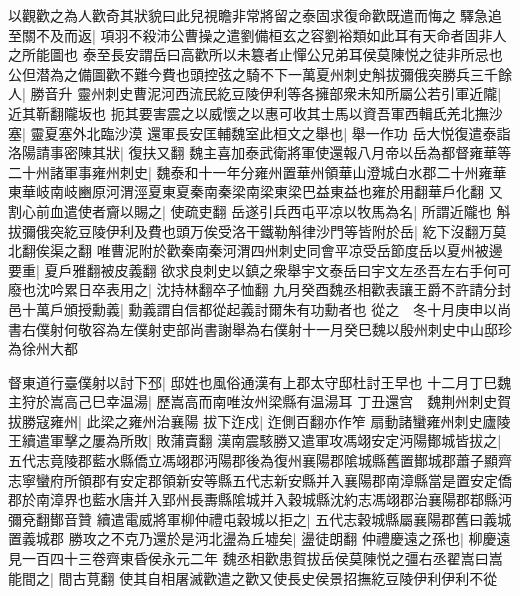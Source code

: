 以觀歡之為人歡奇其狀貌曰此兒視瞻非常將留之泰固求復命歡既遣而悔之驛急追至關不及而返|{
	項羽不殺沛公曹操之遣劉備桓玄之容劉裕類如此耳有天命者固非人之所能圖也}
泰至長安謂岳曰高歡所以未簒者止憚公兄弟耳侯莫陳悦之徒非所忌也公但潜為之備圖歡不難今費也頭控弦之騎不下一萬夏州刺史斛拔彌俄突勝兵三千餘人|{
	勝音升}
靈州刺史曹泥河西流民紇豆陵伊利等各擁部衆未知所屬公若引軍近隴|{
	近其靳翻隴坂也}
扼其要害震之以威懷之以惠可收其士馬以資吾軍西輯氐羌北撫沙塞|{
	靈夏塞外北臨沙漠}
還軍長安匡輔魏室此桓文之舉也|{
	舉一作功}
岳大悦復遣泰詣洛陽請事密陳其狀|{
	復扶又翻}
魏主喜加泰武衛將軍使還報八月帝以岳為都督雍華等二十州諸軍事雍州刺史|{
	魏泰和十一年分雍州置華州領華山澄城白水郡二十州雍華東華岐南岐豳原河渭涇夏東夏秦南秦梁南梁東梁巴益東益也雍於用翻華戶化翻}
又割心前血遣使者齎以賜之|{
	使疏吏翻}
岳遂引兵西屯平凉以牧馬為名|{
	所謂近隴也}
斛拔彌俄突紇豆陵伊利及費也頭万俟受洛干鐵勒斛律沙門等皆附於岳|{
	紇下沒翻万莫北翻俟渠之翻}
唯曹泥附於歡秦南秦河渭四州刺史同會平凉受岳節度岳以夏州被邊要重|{
	夏戶雅翻被皮義翻}
欲求良刺史以鎮之衆舉宇文泰岳曰宇文左丞吾左右手何可廢也沈吟累日卒表用之|{
	沈持林翻卒子恤翻}
九月癸酉魏丞相歡表讓王爵不許請分封邑十萬戶頒授勳義|{
	勳義謂自信都從起義討爾朱有功勳者也}
從之　冬十月庚申以尚書右僕射何敬容為左僕射吏部尚書謝舉為右僕射十一月癸巳魏以殷州刺史中山邸珍為徐州大都

督東道行臺僕射以討下邳|{
	邸姓也風俗通漢有上郡太守邸杜討王早也}
十二月丁巳魏主狩於嵩高己巳幸温湯|{
	歷嵩高而南唯汝州梁縣有温湯耳}
丁丑還宫　魏荆州刺史賀拔勝寇雍州|{
	此梁之雍州治襄陽}
拔下迮戍|{
	迮側百翻亦作笮}
扇動諸蠻雍州刺史廬陵王續遣軍擊之屢為所敗|{
	敗蒲賣翻}
漢南震駭勝又遣軍攻馮翊安定沔陽鄼城皆拔之|{
	五代志竟陵郡藍水縣僑立馮翊郡沔陽郡後為復州襄陽郡隂城縣舊置鄼城郡蕭子顯齊志寧蠻府所領郡有安定郡領新安等縣五代志新安縣并入襄陽郡南漳縣當是置安定僑郡於南漳界也藍水唐并入郢州長夀縣隂城并入穀城縣沈約志馮翊郡治襄陽郡鄀縣沔彌兗翻鄼音贊}
續遣電威將軍柳仲禮屯穀城以拒之|{
	五代志穀城縣屬襄陽郡舊曰義城置義城郡}
勝攻之不克乃還於是沔北盪為丘墟矣|{
	盪徒朗翻}
仲禮慶遠之孫也|{
	柳慶遠見一百四十三卷齊東昏侯永元二年}
魏丞相歡患賀拔岳侯莫陳悦之彊右丞翟嵩曰嵩能間之|{
	間古莧翻}
使其自相屠滅歡遣之歡又使長史侯景招撫紇豆陵伊利伊利不從

